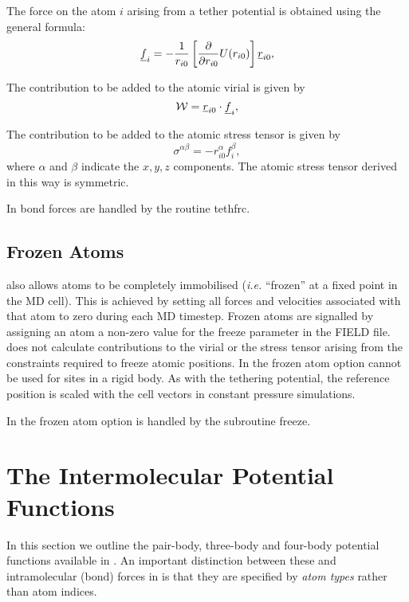 The force on the atom $i$ arising from a tether potential is obtained
using the general formula:
\begin{equation}
\mbox{$\underline{f}$}_{i}=-\frac{1}{r_{i0}}\left[
\frac{\partial }{\partial r_{i0}}U(r_{i0})\right]\mbox{$\underline{r}$}_{i0},
\end{equation}

The contribution to be added to the atomic virial is given by
\begin{equation}
{\cal W}=\mbox{$\underline{r}$}_{i0}\cdot \mbox{$\underline{f}$}_{i},
\end{equation}

The contribution to be added to the atomic stress tensor is
given by
\begin{equation}
\sigma^{\alpha \beta}=-r_{i0}^{\alpha}f_{i}^{\beta},
\end{equation}
where $\alpha$ and $\beta$ indicate the $x,y,z$ components. The atomic
stress tensor derived in this way is symmetric.

In \D{} bond forces are handled by the routine {\sc tethfrc}.

\subsection{Frozen Atoms}
\D{} also allows atoms to be completely immobilised ({\em i.e.}
``frozen'' at a fixed point in the MD cell). This is achieved by
setting all forces and velocities associated with that atom to zero
during each MD timestep.  Frozen atoms are signalled by assigning an
atom a non-zero value for the freeze parameter in the FIELD file.  \D{}
does not calculate contributions to the virial or the stress
tensor
arising from the constraints required to freeze atomic positions. In
\D{} the frozen atom option cannot be used for sites in a rigid
body. As with the tethering potential, the reference position is scaled with
the cell vectors in constant pressure simulations.

In \D{} the frozen atom option is handled by the subroutine {\sc freeze}.


\section{The Intermolecular Potential Functions}
\label{intermolecular}
In this section we outline the pair-body, three-body and four-body
potential functions available in \D{}. An important distinction between
these and intramolecular (bond) forces in \D{} is that they are
specified by {\em atom types} rather than atom indices.

